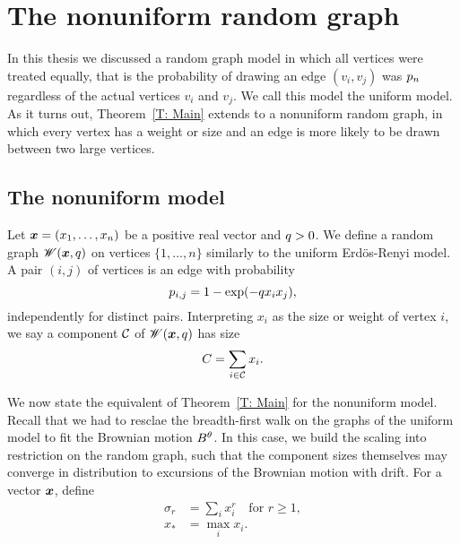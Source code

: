 
\chapter{The nonuniform random graph} \label{C: nonuniform graph}

In this thesis we discussed a random graph model in which all vertices were treated equally,
that is the probability of drawing an edge $(v_i,v_j)$ was $p_n$ regardless of the actual vertices $v_i$ and $v_j$.
We call this model the uniform model.
As it turns out, Theorem~\ref{T: Main} extends to a nonuniform random graph,
in which every vertex has a weight or size and an edge is more likely to be drawn between two large vertices.

\section{The nonuniform model}
Let $\boldsymbol{x} = (x_1, \dots, x_n)$ be a positive real vector and $q > 0$.
We define a random graph $\mathscr{W}(\boldsymbol{x}, q)$ on vertices $\{1, \dots, n\}$ similarly to the uniform Erdös-Renyi model.
A pair $(i, j)$ of vertices is an edge with probability
\begin{equation}
	p_{i,j} = 1 - \exp(-q x_i x_j),
\end{equation}
independently for distinct pairs.
Interpreting $x_i$ as the size or weight of vertex $i$, we say a component $\mathcal{C}$ of $\mathscr{W}(\boldsymbol{x}, q)$ has size
\begin{equation}
	C = \sum_{i \in \mathcal{C}} x_i.
\end{equation}

We now state the equivalent of Theorem~\ref{T: Main} for the nonuniform model.
Recall that we had to resclae the breadth-first walk on the graphs of the uniform model to fit the Brownian motion $B^{\theta}$.
In this case, we build the scaling into restriction on the random graph, 
such that the component sizes themselves may converge in distribution to excursions of the Brownian motion with drift.
For a vector $\boldsymbol{x}$, define
\begin{equation}
\begin{aligned}
	\sigma_r &= \sum_{i} x_i^r \quad \text{for $r \geq 1$}, \\
	x_* &= \max_i x_i.
\end{aligned}
\end{equation}



